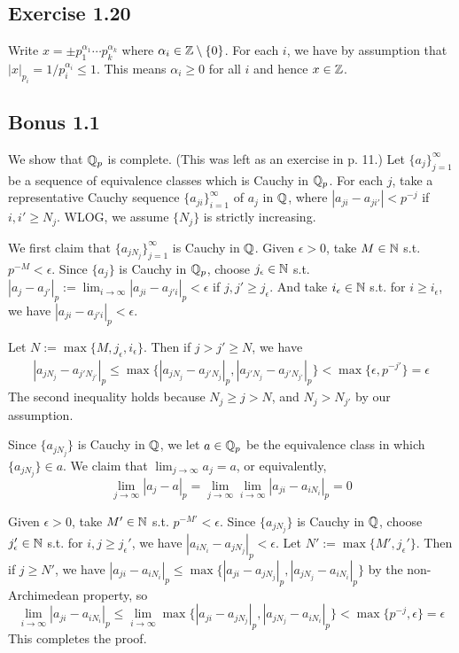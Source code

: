 \documentclass[../Koblitz.tex]{subfiles}
\begin{document}
\subsection*{Exercise 1.20}

Write $x=\pm p_1^{\alpha_1}\cdots p_k^{\alpha_k}$ where $\alpha_i\in\mathbb{Z}\setminus\{0\}$. For each $i$, we have by assumption that $|x|_{p_i} = 1/p_i^{\alpha_i} \leq 1$. This means $\alpha_i \geq 0$ for all $i$ and hence $x\in\mathbb{Z}$.

\subsection*{Bonus 1.1}

We show that $\mathbb{Q}_p$ is complete. (This was left as an exercise in p. 11.) Let $\{a_j\}_{j=1}^\infty$ be a sequence of equivalence classes which is Cauchy in $\mathbb{Q}_p$. For each $j$, take a representative Cauchy sequence $\{a_{ji}\}_{i=1}^\infty$ of $a_j$ in $\mathbb{Q}$, where $|a_{ji}-a_{ji'}|<p^{-j}$ if $i,i'\geq N_j$. WLOG, we assume $\{N_j\}$ is strictly increasing.

We first claim that $\{a_{jN_j}\}_{j=1}^\infty$ is Cauchy in $\mathbb{Q}$. Given $\epsilon>0$, take $M\in\mathbb{N}$ s.t. $p^{-M}<\epsilon$. Since $\{a_j\}$ is Cauchy in $\mathbb{Q}_p$, choose $j_\epsilon\in\mathbb{N}$ s.t. $|a_j-a_{j'}|_p := \lim_{i\to\infty} |a_{ji}-a_{j'i}|_p < \epsilon$ if $j,j'\geq j_\epsilon$. And take $i_\epsilon\in\mathbb{N}$ s.t. for $i\geq i_\epsilon$, we have $|a_{ji}-a_{j'i}|_p <\epsilon$.

Let $N := \max\{M,j_\epsilon,i_\epsilon\}$. Then if $j>j'\geq N$, we have
\begin{align*}
    |a_{jN_j}-a_{j'N_{j'}}|_p \leq \max\{|a_{jN_j}-a_{j'N_j}|_p,|a_{j'N_j}-a_{j'N_{j'}}|_p\} < \max\{\epsilon,p^{-j'}\} = \epsilon
\end{align*}
The second inequality holds because $N_j \geq j > N$, and $N_j>N_{j'}$ by our assumption.

Since $\{a_{jN_j}\}$ is Cauchy in $\mathbb{Q}$, we let $a\in\mathbb{Q}_p$ be the equivalence class in which $\{a_{jN_j}\}\in a$. We claim that $\lim_{j\to\infty} a_j=a$, or equivalently, $$\lim_{j\to\infty} |a_j-a|_p = \lim_{j\to\infty}\lim_{i\to\infty} |a_{ji}-a_{iN_i}|_p = 0$$

Given $\epsilon>0$, take $M'\in\mathbb{N}$ s.t. $p^{-M'}<\epsilon$. Since $\{a_{jN_j}\}$ is Cauchy in $\mathbb{Q}$, choose $j_\epsilon'\in\mathbb{N}$ s.t. for $i,j\geq j_\epsilon'$, we have $|a_{iN_i}-a_{jN_j}|_p<\epsilon$. Let $N':=\max\{M',j_\epsilon'\}$. Then if $j\geq N'$, we have $|a_{ji}-a_{iN_i}|_p \leq \max\{|a_{ji}-a_{jN_j}|_p,|a_{jN_j}-a_{iN_i}|_p\}$ by the non-Archimedean property, so $$\lim_{i\to\infty}|a_{ji}-a_{iN_i}|_p \leq \lim_{i\to\infty}\max\{|a_{ji}-a_{jN_j}|_p,|a_{jN_j}-a_{iN_i}|_p\} < \max\{p^{-j},\epsilon\} = \epsilon$$ This completes the proof.
\end{document}
